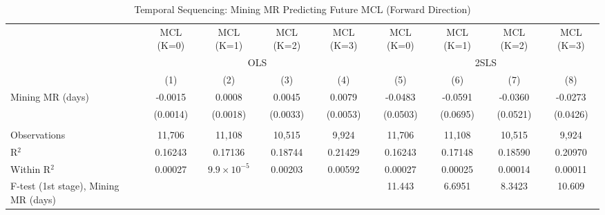 
\begin{table}[htbp]
   
   \caption{\label{tab:strategic_lead_lag} Temporal Sequencing: Mining MR Predicting Future MCL (Forward Direction)}
   \bigskip
   
   \centering
   
   \begin{adjustbox}{width = \textwidth, center}
      
      
      \begin{tabular}{lcccccccc}
         \toprule
         
                                              & MCL (K=0)     & MCL (K=1)            & MCL (K=2)     & MCL (K=3)     & MCL (K=0)     & MCL (K=1)     & MCL (K=2)     & MCL (K=3)\\  
         
          & \multicolumn{4}{c}{OLS} & \multicolumn{4}{c}{2SLS} \\ 
         
                                              & (1)           & (2)                  & (3)           & (4)           & (5)           & (6)           & (7)           & (8)\\  
         
         \midrule 
         Mining MR (days)                     & -0.0015       & 0.0008               & 0.0045        & 0.0079        & -0.0483       & -0.0591       & -0.0360       & -0.0273\\   
                                              & (0.0014)      & (0.0018)             & (0.0033)      & (0.0053)      & (0.0503)      & (0.0695)      & (0.0521)      & (0.0426)\\   
         
          \\
         
         Observations                         & 11,706        & 11,108               & 10,515        & 9,924         & 11,706        & 11,108        & 10,515        & 9,924\\  
         R$^2$                                & 0.16243       & 0.17136              & 0.18744       & 0.21429       & 0.16243       & 0.17148       & 0.18590       & 0.20970\\  
         Within R$^2$                         & 0.00027       & $9.9\times 10^{-5}$  & 0.00203       & 0.00592       & 0.00027       & 0.00025       & 0.00014       & 0.00011\\  
         F-test (1st stage), Mining MR (days) &               &                      &               &               & 11.443        & 6.6951        & 8.3423        & 10.609\\  
         

\end{tabular}
\end{adjustbox}
\end{table}
